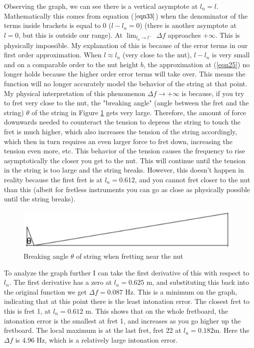 Observing the graph, we can see there is a vertical asymptote at $l_n = l$. Mathematically this comes from equation ($\ref{eqn33}$) when the denominator of the terms inside brackets is equal to 0 ($l-l_n = 0$) (there is another asymptote at $l=0$, but this is outside our range). At $\lim_{l_n \to l^-}$ $\Delta f$ approaches $+\infty$. This is physically impossible. My explanation of this is because of the error terms in our first order approximation. When $l \approx l_n$ (very close to the nut), $l-l_n$ is very small and on a comparable order to the nut height $b$, the approximation at (\ref{eqn25}) no longer holds because the higher order error terms will take over. This means the function will no longer accurately model the behavior of the string at that point. My physical interpretation of this phenomenon $\Delta f \to +\infty $ is because, if you try to fret very close to the nut, the "breaking angle" (angle between the fret and the string) $\theta$ of the string in Figure \ref{fig8} gets very large. Therefore, the amount of force downwards needed to counteract the tension to depress the string to touch the fret is much higher, which also increases the tension of the string accordingly, which then in turn requires an even larger force to fret down, increasing the tension even more, etc. This behavior of the tension causes the frequency to rise asymptotically the closer you get to the nut. This will continue until the tension in the string is too large and the string breaks. However, this doesn't happen in reality because the first fret is at $l_n = 0.612$, and you cannot fret closer to the nut than this (albeit for fretless instruments you can go as close as physically possible until the string breaks). \par
\begin{figure}[!htb]
    \includegraphics[width=\textwidth]{./ee/breaking_angles.png}
    \caption{Breaking angle $\theta$ of string when fretting near the nut} \label{fig8}
\end{figure}
To analyze the graph further I can take the first derivative of this with respect to $l_n$. The first derivative has a zero at $l_n = 0.625$ m, and substituting this back into the original function we get $\Delta f = 0.087$ Hz. This is a minimum on the graph, indicating that at this point there is the least intonation error. The closest fret to this is fret 1, at $l_n = 0.612$ m. This shows that on the whole fretboard, the intonation error is the smallest at fret 1, and increases as you go higher up the fretboard. The local maximum is at the last fret, fret 22 at $l_n = 0.182 $m. Here the $\Delta f$ is 4.96 Hz, which is a relatively large intonation error.

